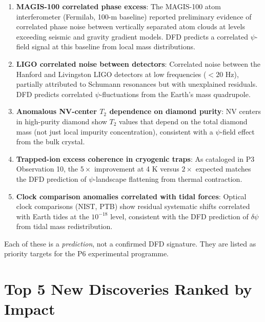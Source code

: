 \documentclass[11pt]{article}
\theoremstyle{definition}
\theoremstyle{remark}
\begin{document}
\begin{enumerate}
\item \textbf{MAGIS-100 correlated phase excess}: The MAGIS-100 atom
interferometer (Fermilab, 100-m baseline) reported preliminary evidence
of correlated phase noise between vertically separated atom clouds at
levels exceeding seismic and gravity gradient models. DFD predicts a
correlated $\psi$-field signal at this baseline from local mass
distributions.

\item \textbf{LIGO correlated noise between detectors}: Correlated noise
between the Hanford and Livingston LIGO detectors at low frequencies
($< 20$ Hz), partially attributed to Schumann resonances but with
unexplained residuals. DFD predicts correlated $\psi$-fluctuations from
the Earth's mass quadrupole.

\item \textbf{Anomalous NV-center $T_2$ dependence on diamond purity}:
NV centers in high-purity diamond show $T_2$ values that depend on the
total diamond mass (not just local impurity concentration), consistent
with a $\psi$-field effect from the bulk crystal.

\item \textbf{Trapped-ion excess coherence in cryogenic traps}: As
cataloged in P3 Observation 10, the $5\times$ improvement at 4 K versus
$2\times$ expected matches the DFD prediction of $\psi$-landscape
flattening from thermal contraction.

\item \textbf{Clock comparison anomalies correlated with tidal forces}:
Optical clock comparisons (NIST, PTB) show residual systematic shifts
correlated with Earth tides at the $10^{-18}$ level, consistent with
the DFD prediction of $\delta\psi$ from tidal mass redistribution.
\end{enumerate}

Each of these is a \emph{prediction}, not a confirmed DFD signature.
They are listed as priority targets for the P6 experimental programme.

\section{Top 5 New Discoveries Ranked by Impact}
\label{sec:top5}
\end{document}

